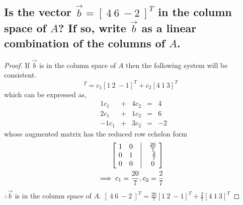 \documentclass[../main.tex]{subfiles}
\begin{document}
\subsection{Is the vector $\vec{b} = [ \ 4 \ 6 \ -2 \ ]^T$ in the column space of $A$? If so, write $\vec{b}$ as a linear combination of the columns of $A$.}
\begin{proof}
        If $\vec{b}$ is in the column space of $A$ then the following system will be consistent.
        \begin{equation*}
                [ \ 4 \ 6 \ -2 \ ]^T = c_1[1 \ 2 \ -1]^T + c_2[4 \ 1 \ 3]^T
        \end{equation*}
        which can be expressed as,
        $$
                \begin{matrix}
                         & 1c_{1}  & + & 4c_{2} & = & 4  \\
                         & 2c_{1}  & + & 1c_{2} & = & 6  \\
                         & -1c_{1} & + & 3c_{2} & = & -2
                \end{matrix}
        $$
        whose augmented matrix has the reduced row echelon form
        \begin{align*}
                \begin{bmatrix}
                        \ 1 & 0 & \bigm| & \frac{20}{7}\ \\
                        \ 0 & 1 & \bigm| & \frac{2}{7}   \\
                        \ 0 & 0 & \bigm| & 0\
                \end{bmatrix} \\
                \implies c_1 = \frac{20}{7}, c_2 = \frac{2}{7}
        \end{align*}
        $\therefore \vec{b}$ is in the column space of $A$. $[ \ 4 \ 6 \ -2 \ ]^T = \frac{20}{7}[1 \ 2 \ -1]^T + \frac{2}{7}[4 \ 1 \ 3]^T$
\end{proof}
\end{document}
